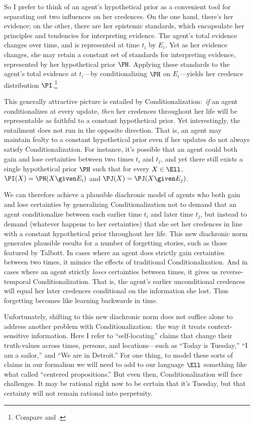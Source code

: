 So I prefer to think of an agent's hypothetical prior as a convenient tool for separating out two influences on her credences. On the one hand, there's her evidence; on the other, there are her epistemic standards, which encapsulate her principles and tendencies for interpreting evidence. The agent's total evidence changes over time, and is represented at time $t_i$ by $E_i$. Yet as her evidence changes, she may retain a constant set of standards for interpreting evidence, represented by her hypothetical prior $\PH$. Applying these standards to the agent's total evidence at $t_i$---by conditionalizing $\PH$ on $E_i$---yields her credence distribution $\PI$.\footnote
{Compare \citet{SchoenfieldPermission} and \citet{MeachamUr}.}

This generally attractive picture is entailed by Conditionalization:\ \emph{if} an agent conditionalizes at every update, \emph{then} her credences throughout her life will be representable as faithful to a constant hypothetical prior. Yet interestingly, the entailment does not run in the opposite direction. That is, an agent may maintain fealty to a constant hypothetical prior even if her updates do not always satisfy Conditionalization. For instance, it's possible that an agent could both gain and lose certainties between two times $t_i$ and $t_j$, and yet there still exists a single hypothetical prior $\PH$ such that for every $X \in \Ell$, $\PI(X)=\PH(X \given E_i)$ and $\PJ(X)=\PJ(X \given E_j)$.

We can therefore achieve a plausible diachronic model of agents who both gain and lose certainties by generalizing Conditionalization not to demand that an agent conditionalize between each earlier time $t_i$ and later time $t_j$, but instead to demand (whatever happens to her certainties) that she set her credences in line with a constant hypothetical prior throughout her life. This new diachronic norm generates plausible results for a number of forgetting stories, such as those featured by Talbott. In cases where an agent does strictly gain certainties between two times, it mimics the effects of traditional Conditionalization. And in cases where an agent strictly \emph{loses} certainties between times, it gives us reverse-temporal Conditionalization. That is, the agent's earlier unconditional credences will equal her later credences conditional on the information she lost. Thus forgetting becomes like learning backwards in time.
 
Unfortunately, shifting to this new diachronic norm does not suffice alone to address another problem with Conditionalization:\ the way it treats context-sensitive information. Here I refer to ``self-locating'' claims that change their truth-values across times, persons, and locations---such as ``Today is Tuesday,'' ``I am a sailor,'' and ``We are in Detroit.'' For one thing, to model these sorts of claims in our formalism we will need to add to our language $\Ell$ something like what \citet{LewisDeDicto} called ``centered propositions.'' But even then, Conditionalization will face challenges. It may be rational right now to be certain that it's Tuesday, but that certainty will not remain rational into perpetuity.

